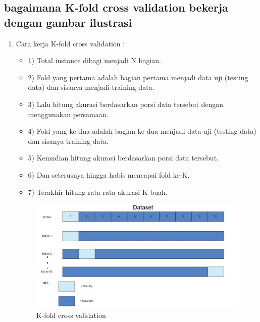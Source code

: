 \begin{enumerate}
\begin{enumerate}
\begin{enumerate}
\subsection{bagaimana K-fold cross validation bekerja dengan gambar ilustrasi}
\begin{enumerate}
\item Cara kerja K-fold cross validation :
\begin{itemize}
\item 1)	Total instance dibagi menjadi N bagian.
\item 2)	Fold yang pertama adalah bagian pertama menjadi data uji (testing data) dan sisanya menjadi training data.
\item 3)	Lalu hitung akurasi berdasarkan porsi data tersebut dengan menggunakan persamaan.
\item 4)	Fold yang ke dua adalah bagian ke dua menjadi data uji (testing data) dan sisanya training data. 
\item 5)	Kemudian hitung akurasi berdasarkan porsi data tersebut.
\item 6)	Dan seterusnya hingga habis mencapai fold ke-K.
\item 7)	Terakhir hitung rata-rata akurasi K buah.
\end{itemize}
\begin{figure}[ht]
\centering
\includegraphics[scale=0.5]{figures/f5.jpg}
\caption{K-fold cross validation }
\label{contoh}
\end{figure}


\end{enumerate}
\end{enumerate}
\end{enumerate}
\end{enumerate}
